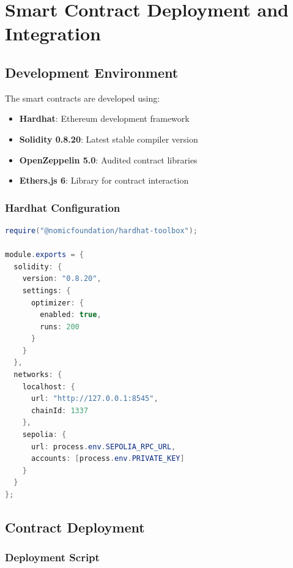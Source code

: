 \chapter{Smart Contract Deployment and Integration}

\section{Development Environment}

The smart contracts are developed using:

\begin{itemize}
    \item \textbf{Hardhat}: Ethereum development framework
    \item \textbf{Solidity 0.8.20}: Latest stable compiler version
    \item \textbf{OpenZeppelin 5.0}: Audited contract libraries
    \item \textbf{Ethers.js 6}: Library for contract interaction
\end{itemize}

\subsection{Hardhat Configuration}

\begin{lstlisting}[language=Java, caption=hardhat.config.js]
require("@nomicfoundation/hardhat-toolbox");

module.exports = {
  solidity: {
    version: "0.8.20",
    settings: {
      optimizer: {
        enabled: true,
        runs: 200
      }
    }
  },
  networks: {
    localhost: {
      url: "http://127.0.0.1:8545",
      chainId: 1337
    },
    sepolia: {
      url: process.env.SEPOLIA_RPC_URL,
      accounts: [process.env.PRIVATE_KEY]
    }
  }
};
\end{lstlisting}

\section{Contract Deployment}

\subsection{Deployment Script}

